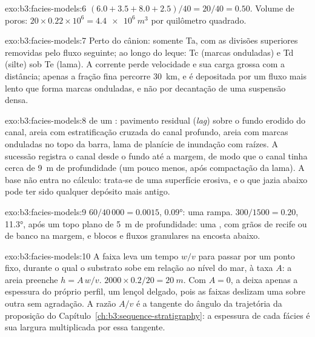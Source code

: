 \begin{solution}{exo:b3:facies-models:6}
$(6.0 + 3.5 + 8.0 + 2.5)/40 = 20/40 = 0.50$. Volume de poros: $20\times0.22
\times10^6 = \qty{4.4e6}{m^3}$ por quilômetro quadrado.
\end{solution}

\begin{solution}{exo:b3:facies-models:7}
Perto do cânion: somente Ta, com as divisões superiores removidas pelo fluxo seguinte; ao longo do
leque: Tc (marcas onduladas) e Td (silte) sob Te (lama). A corrente perde velocidade
e sua carga grossa com a distância; apenas a fração fina percorre
\qty{30}{km}, e é depositada por um fluxo mais lento que forma marcas onduladas, e não
por decantação de uma suspensão densa.
\end{solution}

\begin{solution}{exo:b3:facies-models:8}
 de um : pavimento residual (\textit{lag}) sobre o fundo erodido do canal,
areia com estratificação cruzada do canal profundo, areia com marcas onduladas no topo da barra,
lama de planície de inundação com raízes. A sucessão registra o canal desde o fundo até
a margem, de modo que o canal tinha cerca de \qty{9}{m} de profundidade (um pouco menos, após
compactação da lama). A base não entra no cálculo: trata-se de uma superfície erosiva, e
o que jazia abaixo pode ter sido qualquer depósito mais antigo.
\end{solution}

\begin{solution}{exo:b3:facies-models:9}
$60/40\,000 = 0.0015$, \ang{0.09}: uma rampa. $300/1500 = 0.20$, \ang{11.3},
após um topo plano de \qty{5}{m} de profundidade: uma , com grãos de recife ou de banco
na margem, e blocos e fluxos granulares na encosta abaixo.
\end{solution}

\begin{solution}{exo:b3:facies-models:10}
A faixa leva um tempo $w/v$ para passar por um ponto fixo, durante o qual o substrato
sobe em relação ao nível do mar, à taxa $A$: a areia preenche $h = A\,w/v$.
$2000\times0.2/20 = \qty{20}{m}$. Com $A = 0$, a  deixa apenas
a espessura do próprio perfil, um lençol delgado, pois as faixas deslizam uma sobre
outra sem agradação. A razão $A/v$ é a tangente do ângulo da
trajetória da proposição do Capítulo~\ref{ch:b3:sequence-stratigraphy}:
a espessura de cada fácies é sua largura multiplicada por essa tangente.
\end{solution}

